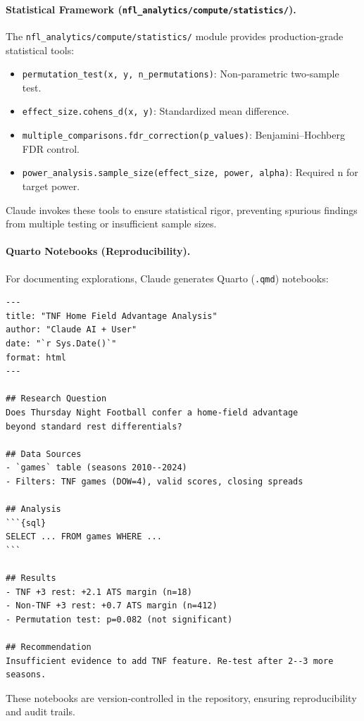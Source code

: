 \paragraph{Statistical Framework (\texttt{nfl\_analytics/compute/statistics/}).}
The \texttt{nfl\_analytics/compute/statistics/} module provides production‑grade statistical tools:
\begin{itemize}
\item \texttt{permutation\_test(x, y, n\_permutations)}: Non‑parametric two‑sample test.
\item \texttt{effect\_size.cohens\_d(x, y)}: Standardized mean difference.
\item \texttt{multiple\_comparisons.fdr\_correction(p\_values)}: Benjamini--Hochberg FDR control.
\item \texttt{power\_analysis.sample\_size(effect\_size, power, alpha)}: Required n for target power.
\end{itemize}

Claude invokes these tools to ensure statistical rigor, preventing spurious findings from multiple testing or insufficient sample sizes.

\paragraph{Quarto Notebooks (Reproducibility).}
For documenting explorations, Claude generates Quarto (\texttt{.qmd}) notebooks:
\begin{verbatim}
---
title: "TNF Home Field Advantage Analysis"
author: "Claude AI + User"
date: "`r Sys.Date()`"
format: html
---

## Research Question
Does Thursday Night Football confer a home-field advantage
beyond standard rest differentials?

## Data Sources
- `games` table (seasons 2010--2024)
- Filters: TNF games (DOW=4), valid scores, closing spreads

## Analysis
```{sql}
SELECT ... FROM games WHERE ...
```

## Results
- TNF +3 rest: +2.1 ATS margin (n=18)
- Non-TNF +3 rest: +0.7 ATS margin (n=412)
- Permutation test: p=0.082 (not significant)

## Recommendation
Insufficient evidence to add TNF feature. Re-test after 2--3 more seasons.
\end{verbatim}

These notebooks are version‑controlled in the repository, ensuring reproducibility and audit trails.

